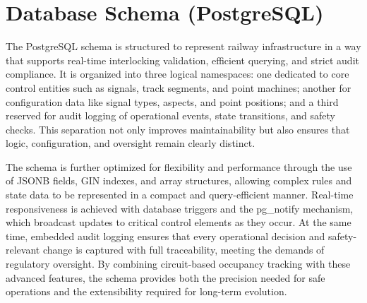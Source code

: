 \section{Database Schema (PostgreSQL)}
\label{sec:implementation:database-schema}

The PostgreSQL schema is structured to represent railway infrastructure in a way that supports real-time interlocking validation, efficient querying, and strict audit compliance. It is organized into three logical namespaces: one dedicated to core control entities such as signals, track segments, and point machines; another for configuration data like signal types, aspects, and point positions; and a third reserved for audit logging of operational events, state transitions, and safety checks. This separation not only improves maintainability but also ensures that logic, configuration, and oversight remain clearly distinct.

The schema is further optimized for flexibility and performance through the use of JSONB fields, GIN indexes, and array structures, allowing complex rules and state data to be represented in a compact and query-efficient manner. Real-time responsiveness is achieved with database triggers and the pg\_notify mechanism, which broadcast updates to critical control elements as they occur. At the same time, embedded audit logging ensures that every operational decision and safety-relevant change is captured with full traceability, meeting the demands of regulatory oversight. By combining circuit-based occupancy tracking with these advanced features, the schema provides both the precision needed for safe operations and the extensibility required for long-term evolution.